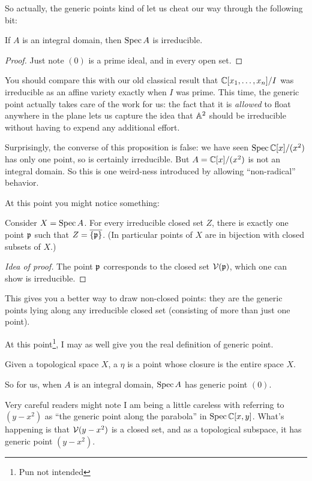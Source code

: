 So actually, the generic points
kind of let us cheat our way through the following bit:
\begin{proposition}
	If $A$ is an integral domain,
	then $\operatorname{Spec} A$ is irreducible.
\end{proposition}
\begin{proof}
	Just note $(0)$ is a prime ideal,
	and in every open set.
\end{proof}
You should compare this with our old classical result that
$\mathbb C[x_1, \dots, x_n]/I$
was irreducible as an affine variety exactly when $I$ was prime.
This time, the generic point actually takes care
of the work for us:
the fact that it is \emph{allowed} to float
anywhere in the plane lets us capture the idea that
$\mathbb A^2$ should be irreducible
without having to expend any additional effort.
\begin{remark}
	Surprisingly, the converse of this proposition is false:
	we have seen $\operatorname{Spec} \mathbb C[x]/(x^2)$ has only one point,
	so is certainly irreducible.
	But $A = \mathbb C[x]/(x^2)$ is not an integral domain.
	So this is one weird-ness introduced by allowing ``non-radical'' behavior.
\end{remark}

At this point you might notice something:
\begin{theorem}
	Consider $X = \operatorname{Spec} A$.
	For every irreducible closed set $Z$,
	there is exactly one point $\mathfrak p$ such that $Z = \overline{\{\mathfrak p\}}$.
	(In particular points of $X$ are in bijection
	with closed subsets of $X$.)
\end{theorem}
\begin{proof}
	[Idea of proof]
	The point $\mathfrak p$ corresponds to the closed set $\mathcal V(\mathfrak p)$,
	which one can show is irreducible.
\end{proof}
This gives you a better way to draw non-closed points:
they are the generic points lying along any irreducible closed set
(consisting of more than just one point).

At this point\footnote{Pun not intended},
I may as well give you the real definition of generic point.
\begin{definition}
	Given a topological space $X$,
	a  $\eta$
	is a point whose closure is the entire space $X$.
\end{definition}
So for us, when $A$ is an integral domain,
$\operatorname{Spec} A$ has generic point $(0)$.
\begin{abuse}
	Very careful readers might note I am being a little careless
	with referring to $(y-x^2)$ as
	``the generic point along the parabola''
	in $\operatorname{Spec} \mathbb C[x,y]$.
	What's happening is that $\mathcal V(y-x^2)$ is a closed set,
	and as a topological subspace, it has generic point $(y-x^2)$.
\end{abuse}

